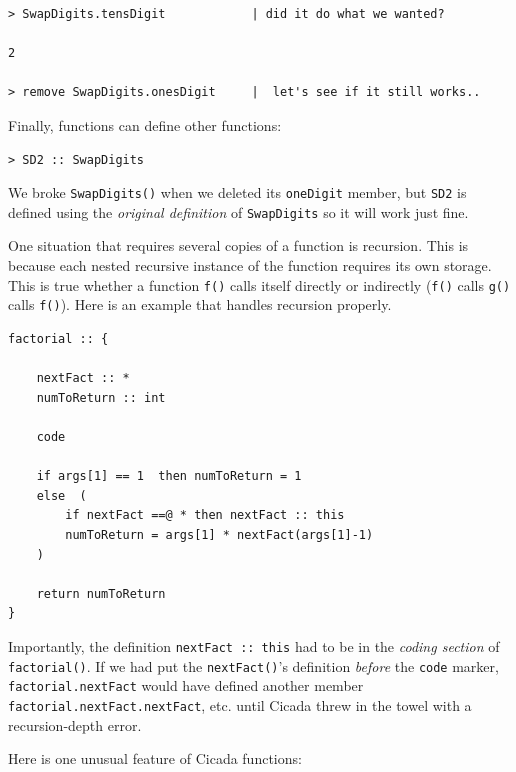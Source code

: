 \documentclass{article}
\newenvironment{code}{
       \begin{list}{}{
               \setlength{\leftmargin}{.4in}
               \setlength{\rightmargin}{0in}
               \setlength{\topsep}{.2in}
       }
       \small
       \item[] }
       { \end{list}   }
\begin{document}
\begin{code} \begin{verbatim}
> SwapDigits.tensDigit            | did it do what we wanted?

2

> remove SwapDigits.onesDigit     |  let's see if it still works..
\end{verbatim} \end{code}

Finally, functions can define other functions:

\begin{code} \begin{verbatim}
> SD2 :: SwapDigits
\end{verbatim} \end{code}

\noindent We broke \verb#SwapDigits()# when we deleted its \verb#oneDigit# member, but \verb#SD2# is defined using the \emph{original definition} of \verb#SwapDigits# so it will work just fine.

One situation that requires several copies of a function is recursion.  This is because each nested recursive instance of the function requires its own storage.  This is true whether a function \verb#f()# calls itself directly or indirectly (\verb#f()# calls \verb#g()# calls \verb#f()#).  Here is an example that handles recursion properly.

\begin{code} \begin{verbatim}
factorial :: {
    
    nextFact :: *
    numToReturn :: int
    
    code
    
    if args[1] == 1  then numToReturn = 1
    else  (
        if nextFact ==@ * then nextFact :: this
        numToReturn = args[1] * nextFact(args[1]-1)
    )
    
    return numToReturn
}
\end{verbatim} \end{code}

\noindent Importantly, the definition \verb#nextFact :: this# had to be in the \emph{coding section} of \verb#factorial()#.  If we had put the \verb#nextFact()#'s definition \emph{before} the \verb#code# marker, \verb#factorial.nextFact# would have defined another member \verb#factorial.nextFact.nextFact#, etc. until Cicada threw in the towel with a recursion-depth error.

Here is one unusual feature of Cicada functions:
\end{document}
